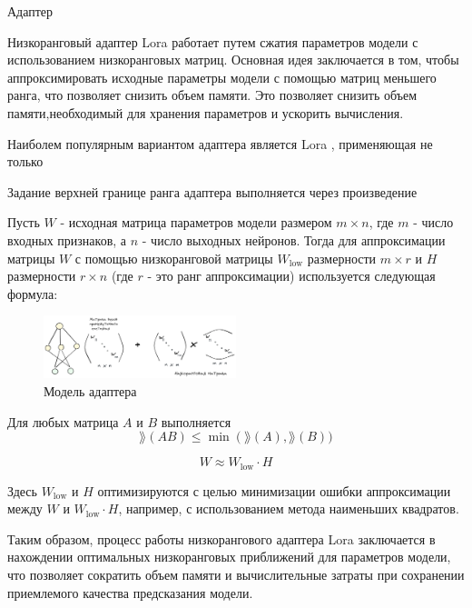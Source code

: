  Адаптер

Низкоранговый адаптер Lora работает путем сжатия 
параметров модели с использованием низкоранговых матриц. 
Основная идея заключается в том, 
чтобы аппроксимировать исходные параметры модели с
помощью матриц меньшего ранга, что позволяет снизить объем памяти.
Это позволяет снизить объем памяти,необходимый для хранения параметров и ускорить вычисления. 


Наиболем популярным вариантом адаптера является Lora \cite{hu2021lora}, применяющая не только 

Задание верхней границе ранга адаптера выполняется через произведение 

Пусть $W$ - исходная матрица параметров модели размером
 $m \times n$, где $m$ - число входных признаков, 
 а \( n \) - число выходных нейронов.
Тогда для аппроксимации матрицы $W$ с
помощью низкоранговой матрицы $W_{\text{low}}$
размерности \( m \times r \) и \( H \) размерности \( r \times n \) (где \( r \) - это ранг аппроксимации) используется следующая формула:



\begin{figure}[h]
    \centering
    \includegraphics[width=0.5\textwidth]{assets/ml/adapter/adapter.excalidraw.png}
    \caption{Модель адаптера \cite{stablediffusion}}
    \label{sd_learning}
\end{figure}



Для любых матрица $A$ и $B$ выполняется
$$
    \rang(𝐴𝐵) \le \min\left(\rang(𝐴),\rang(𝐵))
$$

$$
    W \approx W_{\text{low}} \cdot H
$$

Здесь \( W_{\text{low}} \) и \( H \) оптимизируются с целью минимизации ошибки аппроксимации между \( W \) и \( W_{\text{low}} \cdot H \), например, с использованием метода наименьших квадратов.

Таким образом, процесс работы низкорангового адаптера Lora заключается в нахождении оптимальных низкоранговых приближений для параметров модели, что позволяет сократить объем памяти и вычислительные затраты при сохранении приемлемого качества предсказания модели.
